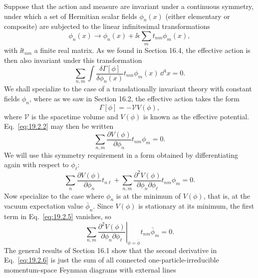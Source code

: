 Suppose that the action and measure are invariant under a continuous
symmetry, under which a set of Hermitian scalar fields $\phi_n(x)$ (either
elementary or composite) are subjected to the linear infinitesimal
transformations
\begin{equation}
 \phi_n(x)\longrightarrow\phi_n(x)
 +\ii\epsilon\sum_m t_{nm}\phi_m(x),
 \tag{19.2.1}\label{eq:19.2.1}
\end{equation}
with $\ii t_{nm}$ a finite real matrix. As we found in Section 16.4, the
effective action is then also invariant under this transformation
\begin{equation}
 \sum_{n,m}\int
 \frac{\delta\Gamma[\phi]}{\delta\phi_n(x)}
 t_{nm}\phi_m(x)\,\dd^4x=0.
 \tag{19.2.2}\label{eq:19.2.2}
\end{equation}
We shall specialize to the case of a translationally invariant theory with
constant fields $\phi_n$, where as we saw in Section 16.2, the effective
action takes the form
\begin{equation}
 \Gamma[\phi]=-\mathcal V V(\phi),
 \tag{19.2.3}\label{eq:19.2.3}
\end{equation}
where $\mathcal V$ is the spacetime volume and $V(\phi)$ is known as the
effective potential. Eq.~\eqref{eq:19.2.2} may then be written
\begin{equation}
 \sum_{n,m}\frac{\partial V(\phi)}{\partial\phi_n}
 t_{nm}\phi_m=0.
 \tag{19.2.4}\label{eq:19.2.4}
\end{equation}
We will use this symmetry requirement in a form obtained by differentiating
again with respect to $\phi_\ell$:
\begin{equation}
 \sum_n\frac{\partial V(\phi)}{\partial\phi_n}t_{n\ell}
 +\sum_{n,m}\frac{\partial^2V(\phi)}
 {\partial\phi_n\partial\phi_\ell}t_{nm}\phi_m=0.
 \tag{19.2.5}\label{eq:19.2.5}
\end{equation}
Now specialize to the case where $\phi_n$ is at the minimum of $V(\phi)$,
that is, at the vacuum expectation value $\bar\phi_n$. Since $V(\phi)$ is
stationary at its minimum, the first term in Eq.~\eqref{eq:19.2.5} vanishes,
so
\begin{equation}
 \left.
 \sum_{n,m}\frac{\partial^2V(\phi)}
 {\partial\phi_n\partial\phi_\ell}
 \right|_{\phi=\bar\phi}
 t_{nm}\bar\phi_m=0.
 \tag{19.2.6}\label{eq:19.2.6}
\end{equation}
The general results of Section 16.1 show that the second derivative in
Eq.~\eqref{eq:19.2.6} is just the sum of all connected
one-particle-irreducible momentum-space Feynman diagrams with external lines
